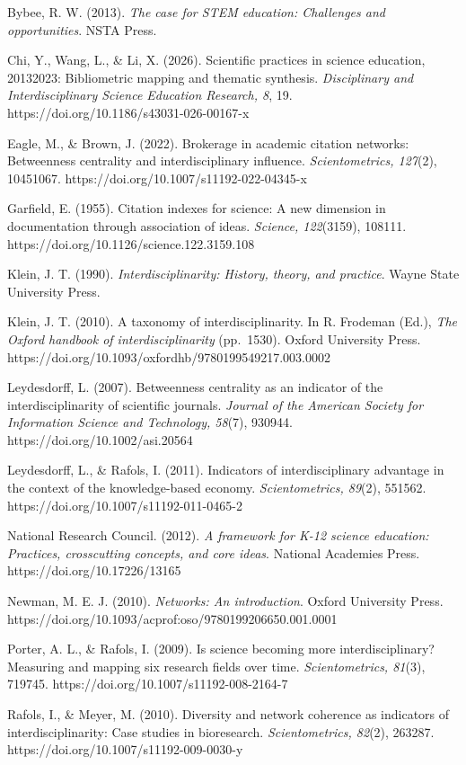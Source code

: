 \documentclass[pdflatex,sn-apa]{sn-jnl}
\begin{document}
Bybee, R. W. (2013). \emph{The case for STEM education: Challenges and
opportunities}. NSTA Press.

Chi, Y., Wang, L., \& Li, X. (2026). Scientific practices in science
education, 20132023: Bibliometric mapping and thematic synthesis.
\emph{Disciplinary and Interdisciplinary Science Education Research, 8},
19. https://doi.org/10.1186/s43031-026-00167-x

Eagle, M., \& Brown, J. (2022). Brokerage in academic citation networks:
Betweenness centrality and interdisciplinary influence.
\emph{Scientometrics, 127}(2), 10451067.
https://doi.org/10.1007/s11192-022-04345-x

Garfield, E. (1955). Citation indexes for science: A new dimension in
documentation through association of ideas. \emph{Science, 122}(3159),
108111. https://doi.org/10.1126/science.122.3159.108

Klein, J. T. (1990). \emph{Interdisciplinarity: History, theory, and
practice}. Wayne State University Press.

Klein, J. T. (2010). A taxonomy of interdisciplinarity. In R. Frodeman
(Ed.), \emph{The Oxford handbook of interdisciplinarity} (pp.~1530).
Oxford University Press.
https://doi.org/10.1093/oxfordhb/9780199549217.003.0002

Leydesdorff, L. (2007). Betweenness centrality as an indicator of the
interdisciplinarity of scientific journals. \emph{Journal of the
American Society for Information Science and Technology, 58}(7), 930944.
https://doi.org/10.1002/asi.20564

Leydesdorff, L., \& Rafols, I. (2011). Indicators of interdisciplinary
advantage in the context of the knowledge-based economy.
\emph{Scientometrics, 89}(2), 551562.
https://doi.org/10.1007/s11192-011-0465-2

National Research Council. (2012). \emph{A framework for K-12 science
education: Practices, crosscutting concepts, and core ideas}. National
Academies Press. https://doi.org/10.17226/13165

Newman, M. E. J. (2010). \emph{Networks: An introduction}. Oxford
University Press.
https://doi.org/10.1093/acprof:oso/9780199206650.001.0001

Porter, A. L., \& Rafols, I. (2009). Is science becoming more
interdisciplinary? Measuring and mapping six research fields over time.
\emph{Scientometrics, 81}(3), 719745.
https://doi.org/10.1007/s11192-008-2164-7

Rafols, I., \& Meyer, M. (2010). Diversity and network coherence as
indicators of interdisciplinarity: Case studies in bioresearch.
\emph{Scientometrics, 82}(2), 263287.
https://doi.org/10.1007/s11192-009-0030-y
\end{document}
